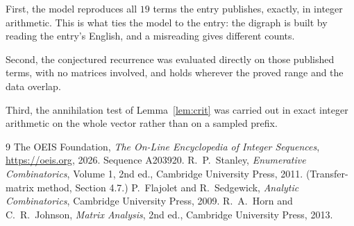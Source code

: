 \documentclass[11pt,a4paper]{article}
\theoremstyle{plain}
\theoremstyle{definition}
\begin{document}
First, the model reproduces all $19$ terms the entry publishes, exactly, in integer
arithmetic. This is what ties the model to the entry: the digraph is built by reading the
entry's English, and a misreading gives different counts.

Second, the conjectured recurrence was evaluated directly on those published terms, with no
matrices involved, and holds wherever the proved range and the data overlap.

Third, the annihilation test of Lemma~\ref{lem:crit} was carried out in exact integer
arithmetic on the whole vector rather than on a sampled prefix.

\begin{thebibliography}{9}
 The OEIS Foundation, \emph{The On-Line Encyclopedia of Integer
Sequences}, \url{https://oeis.org}, 2026. Sequence A203920.
 R.~P.~Stanley, \emph{Enumerative Combinatorics}, Volume 1, 2nd ed.,
Cambridge University Press, 2011. (Transfer-matrix method, Section 4.7.)
 P.~Flajolet and R.~Sedgewick, \emph{Analytic Combinatorics}, Cambridge
University Press, 2009.
 R.~A.~Horn and C.~R.~Johnson, \emph{Matrix Analysis}, 2nd ed., Cambridge
University Press, 2013.
\end{thebibliography}
\end{document}
